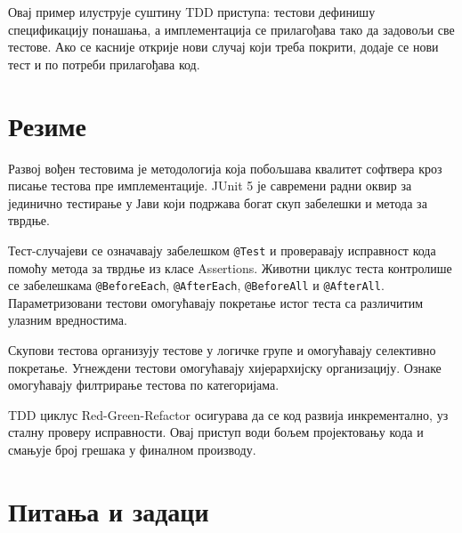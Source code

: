 Овај пример илуструје суштину TDD приступа: тестови дефинишу спецификацију понашања, а имплементација се прилагођава тако да задовољи све тестове. Ако се касније открије нови случај који треба покрити, додаје се нови тест и по потреби прилагођава код.


\section{Резиме}

Развој вођен тестовима је методологија која побољшава квалитет софтвера кроз писање тестова пре имплементације. JUnit 5 је савремени радни оквир за јединично тестирање у Јави који подржава богат скуп забелешки и метода за тврдње.

Тест-случајеви се означавају забелешком \texttt{@Test} и проверавају исправност кода помоћу метода за тврдње из класе Assertions. Животни циклус теста контролише се забелешкама \texttt{@BeforeEach}, \texttt{@AfterEach}, \texttt{@BeforeAll} и \texttt{@AfterAll}. Параметризовани тестови омогућавају покретање истог теста са различитим улазним вредностима.

Скупови тестова организују тестове у логичке групе и омогућавају селективно покретање. Угнеждени тестови омогућавају хијерархијску организацију. Ознаке омогућавају филтрирање тестова по категоријама.

TDD циклус Red-Green-Refactor осигурава да се код развија инкрементално, уз сталну проверу исправности. Овај приступ води бољем пројектовању кода и смањује број грешака у финалном производу.


\section{Питања и задаци}

